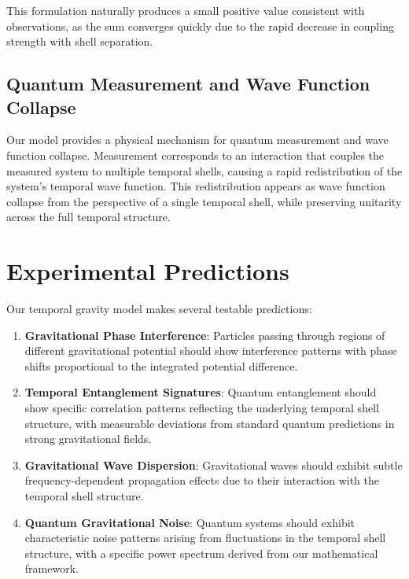 \documentclass[12pt,a4paper]{article}
\begin{document}
This formulation naturally produces a small positive value consistent with observations, as the sum converges quickly due to the rapid decrease in coupling strength with shell separation.

\subsection{Quantum Measurement and Wave Function Collapse}

Our model provides a physical mechanism for quantum measurement and wave function collapse. Measurement corresponds to an interaction that couples the measured system to multiple temporal shells, causing a rapid redistribution of the system's temporal wave function. This redistribution appears as wave function collapse from the perspective of a single temporal shell, while preserving unitarity across the full temporal structure.

\section{Experimental Predictions}

Our temporal gravity model makes several testable predictions:

\begin{enumerate}
    \item \textbf{Gravitational Phase Interference}: Particles passing through regions of different gravitational potential should show interference patterns with phase shifts proportional to the integrated potential difference.
    
    \item \textbf{Temporal Entanglement Signatures}: Quantum entanglement should show specific correlation patterns reflecting the underlying temporal shell structure, with measurable deviations from standard quantum predictions in strong gravitational fields.
    
    \item \textbf{Gravitational Wave Dispersion}: Gravitational waves should exhibit subtle frequency-dependent propagation effects due to their interaction with the temporal shell structure.
    
    \item \textbf{Quantum Gravitational Noise}: Quantum systems should exhibit characteristic noise patterns arising from fluctuations in the temporal shell structure, with a specific power spectrum derived from our mathematical framework.
\end{enumerate}
\end{document}

